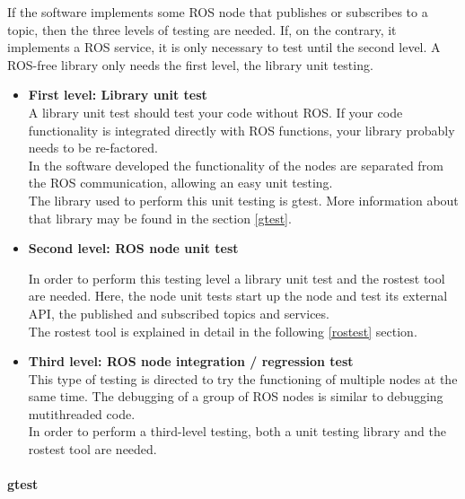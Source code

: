 		If the software implements some ROS node that publishes or subscribes to a topic, then the three levels of testing are needed. If, on the contrary, it implements a ROS service, it is only necessary to test until the second level. A ROS-free library only needs the first level, the library unit testing. 
		\begin{itemize}

			\item{\textbf{First level: Library unit test}}\\

		A library unit test should test your code without ROS. If your code functionality is integrated directly with ROS functions, your library probably needs to be re-factored. 
		\\

		In the software developed the functionality of the nodes are separated from the ROS communication, allowing an easy unit testing. \\

		The library used to perform this unit testing is gtest. More information about that library may be found in the section \ref{gtest}.

			\item{\textbf{Second level: ROS node unit test\\}}

		In order to perform this testing level a library unit test and the rostest tool are needed. Here, the node unit tests start up the node and test its external API, the published and subscribed topics and services. 
		\\

		The rostest tool is explained in detail in the following \ref{rostest} section.

			\item{\textbf{Third level: ROS node integration / regression test}}\\

			This type of testing is directed to try the functioning of multiple nodes at the same time. 
			The debugging of a group of ROS nodes is similar to debugging mutithreaded code. \\

			In order to perform a third-level testing, both a unit testing library and the rostest tool are needed. 
		\end{itemize}

		\paragraph{gtest}\mbox{} \\

